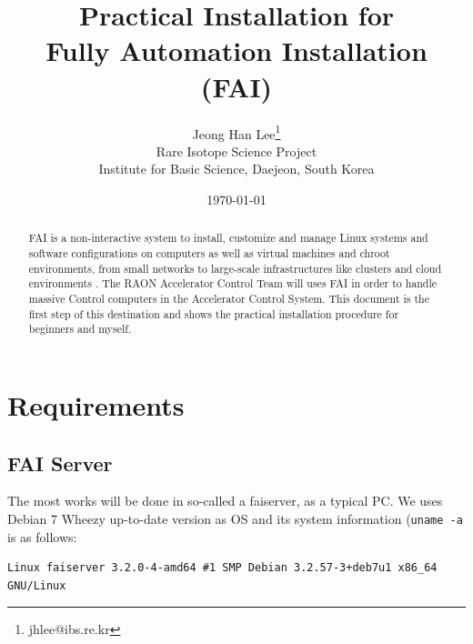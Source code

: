 \documentclass[11pt
  , a4paper
  , article
  , oneside
]{memoir}
\begin{document}
\newcommand{\technumber}{
  RAON Control-Document Series\\
  Revision : v1.1,   Release : June 18, 2014}
\title{\textbf{Practical Installation for \\Fully Automation Installation (FAI)}}

\author{Jeong Han Lee\thanks{jhlee@ibs.re.kr} \\
  Rare Isotope Science Project\\
  Institute for Basic Science, Daejeon, South Korea
}
\date{\today}

\renewcommand{\maketitlehooka}{\begin{flushright}\textsf{\technumber}\end{flushright}}

\maketitle

\begin{abstract}
FAI is a non-interactive system to install, customize and manage Linux systems and software configurations on computers as well as virtual machines and chroot environments, from small networks to large-scale infrastructures like clusters and cloud environments \citep{FAI}. The RAON Accelerator Control Team will uses FAI in order to handle massive Control computers in the Accelerator Control System. This document is the first step of this destination and shows the practical installation procedure for beginners and myself.
\end{abstract}



\chapter{Requirements}

\section{FAI Server}
The most works will be done in so-called a faiserver, as a typical PC. We uses Debian 7 Wheezy up-to-date version as OS and its system information (\texttt{uname -a} is as follows:
\begin{lstlisting}
Linux faiserver 3.2.0-4-amd64 #1 SMP Debian 3.2.57-3+deb7u1 x86_64 GNU/Linux
\end{lstlisting}
\end{document}
